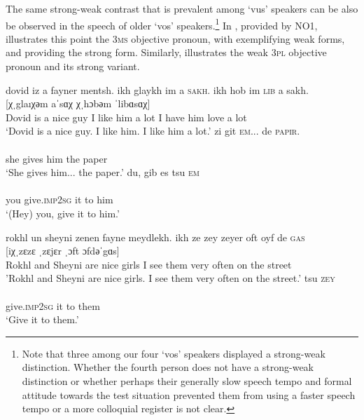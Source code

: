\documentclass[output=paper, hidelinks]{langscibook}
\begin{document}
The same strong-weak contrast that is prevalent among `vus' speakers can be also be observed in the speech of older `vos' speakers.\footnote{Note that three among our four `vos' speakers displayed a strong-weak distinction. Whether the fourth person does not have a strong-weak distinction or whether perhaps their generally slow speech tempo and formal attitude towards the test situation prevented them from using a faster speech tempo or a more colloquial register is not clear.} In , provided by NO1, illustrates this point the 3\textsc{ms} objective pronoun, with  exemplifying weak forms, and  providing the strong form. Similarly,  illustrates the weak 3\textsc{pl} objective pronoun and  its strong variant.

\ea \ea \glll dovid iz a fayner mentsh. {ikh glaykh im} {a \textsc{sakh}}. {ikh hob im} {\textsc{lib} a sakh}.\\
		{} {} {} {} {} [χˌglaıχәm aˈsɑχ χˌhɔbәm ˈlibɑsɑχ]	\\
		Dovid is a nice guy {I like him} {a lot} {I have him} {love a lot}\\
		\glt `Dovid is a nice guy. I like him. I like him a lot.'\label{ex:vos1}
	\ex	\glll zi git \textsc{em}... de \textsc{papir}.\\
		[ˌzi ˌgit ˈɛm... dә pɑˈpir]\\
		she gives him the paper \\
		\glt `She gives him... the paper.'\label{ex:vos1a}
	\ex	\glll du, {gib es tsu} \textsc{em}\\
		[ˌdu ˌgibɛstsә ˈɛm]\\
		you {give.\textsc{imp2sg} it to} him\\
		\glt `(Hey) you, give it to him.'\label{ex:vos1b}
\z
\z

\ea \ea \glll rokhl un sheyni zenen fayne meydlekh. {ikh ze zey} zeyer oft {oyf de \textsc{gas}}\\
	{} {} {} {} {} {} [iχˌzɛzɛ ˌzɛjɛr ˌɔft ɔfdәˈgɑs]\\
	Rokhl and Sheyni are nice girls {I see them} very often {on the street} \\
	\glt 'Rokhl and Sheyni are nice girls. I see them very often on the street.'\label{ex:vos2a}
	\ex {} {tsu \textsc{zey}}\\
	    [ˌgibɛs tsәˈzɛı]\\
	    {give.\textsc{imp2sg} it} {to them} \\
	    \glt `Give it to them.'\label{ex:vos2b}
\z
\z
\end{document}
